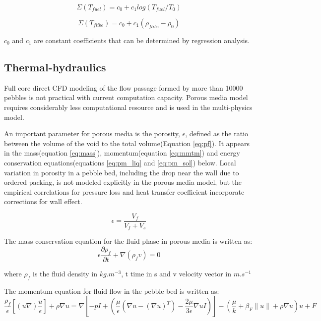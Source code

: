 \documentclass{elsarticle}
\begin{document}
\begin{equation}
  \Sigma(T_{fuel}) = c_0 + c_1log(T_{fuel}/T_0)
\label{eq:xs_fuel}   
\end{equation}

\begin{equation}
  \Sigma(T_{flibe}) = c_0 + c_1(\rho_{flibe} - \rho_0)
\label{eq:xs_flibe}   
\end{equation}

$c_0$ and $c_1$ are constant coefficients that can be determined by regression analysis.






\subsection{Thermal-hydraulics}
Full core direct CFD modeling of the flow passage formed by more than 10000 pebbles is not practical with current computation capacity. Porous media model requires considerably less computational resource and is used in the multi-physics model.

An important parameter for porous media is the porosity, $\epsilon$, defined as the ratio between the volume of the void to the total volume(Equation \ref{eq:pf}). It appears in the mass(equation \ref{eq:mass}), momentum(equation \ref{eq:mmtm}) and energy conservation equations(equations \ref{eq:pm_liq} and \ref{eq:pm_sol}) below. Local variation in porosity in a pebble bed, including the drop near the wall due to ordered packing, is not modeled explicitly in the porous media model, but the empirical correlations for pressure loss and heat transfer coefficient incorporate corrections for wall effect.


\begin{equation}
  \epsilon = \frac{V_f}{V_f+V_s}
  \label{eq:pf}
\end{equation}

The mass conservation equation for the fluid phase in porous media is written as:
\begin{equation}
  \epsilon\frac{\partial \rho_f}{\partial t} + \nabla(\rho_fv) = 0
  \label{eq:mass}
\end{equation}

where $\rho_f$ is the fluid density in $kg.m^{-3}$, t time in s and v velocity vector in $m.s^{-1}$

The momentum equation for fluid flow in the pebble bed is written as:
\begin{equation}
  \frac{\rho_f}{\epsilon} \left[(u\nabla)\frac{u}{\epsilon} \right] + \rho\nabla u = \nabla \left[ -pI + (\frac{\mu}{\epsilon}(\nabla u - (\nabla u)^T) - \frac{2\mu}{3\epsilon} \nabla u I)\right] - (\frac{\mu}{k} + \beta_F \|u\| + \rho\nabla u) u + F
  \label{eq:mmtm}
\end{equation}
\end{document}
